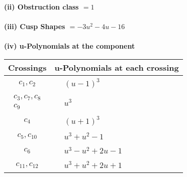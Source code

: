 \documentclass[1p]{elsarticle_modified}
\theoremstyle{definition}
\begin{document}
\flushleft \textbf{(ii) Obstruction class $= 1$}\\~\\
\flushleft \textbf{(iii) Cusp Shapes $= -3 u^2-4 u-16$}\\~\\
\newpage\renewcommand{\arraystretch}{1}
\flushleft \textbf{(iv) u-Polynomials at the component}\newline \\
\begin{tabular}{m{50pt}|m{274pt}}
Crossings & \hspace{64pt}u-Polynomials at each crossing \\
\hline $$\begin{aligned}c_{1},c_{2}\end{aligned}$$&$\begin{aligned}
&(u-1)^3
\end{aligned}$\\
\hline $$\begin{aligned}c_{3},c_{7},c_{8}\\c_{9}\end{aligned}$$&$\begin{aligned}
&u^3
\end{aligned}$\\
\hline $$\begin{aligned}c_{4}\end{aligned}$$&$\begin{aligned}
&(u+1)^3
\end{aligned}$\\
\hline $$\begin{aligned}c_{5},c_{10}\end{aligned}$$&$\begin{aligned}
&u^3+u^2-1
\end{aligned}$\\
\hline $$\begin{aligned}c_{6}\end{aligned}$$&$\begin{aligned}
&u^3- u^2+2 u-1
\end{aligned}$\\
\hline $$\begin{aligned}c_{11},c_{12}\end{aligned}$$&$\begin{aligned}
&u^3+u^2+2 u+1
\end{aligned}$\\
\hline
\end{tabular}\\~\\
\end{document}
